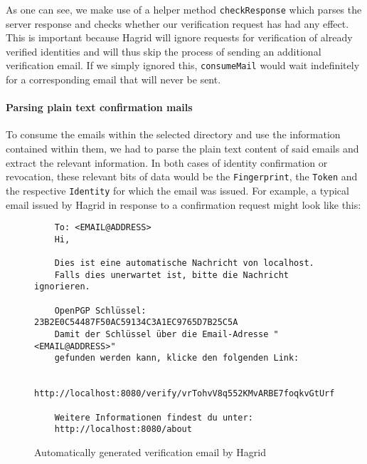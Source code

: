 As one can see, we make use of a helper method \texttt{checkResponse} which parses the server response and checks whether our verification request has had any effect. This is important because Hagrid will ignore requests for verification of already verified identities and will thus skip the process of sending an additional verification email. If we simply ignored this, \texttt{consumeMail} would wait indefinitely for a corresponding email that will never be sent. 

\paragraph{Parsing plain text confirmation mails}
To consume the emails within the selected directory and use the information contained within them, we had to parse the plain text content of said emails and extract the relevant information. In both cases of identity confirmation or revocation, these relevant bits of data would be the \texttt{Fingerprint}, the \texttt{Token} and the respective \texttt{Identity} for which the email was issued. For example, a typical email issued by Hagrid in response to a confirmation request might look like this: 
\begin{figure}[H]
    \begin{verbatim}
    To: <EMAIL@ADDRESS> 
    Hi,
    
    Dies ist eine automatische Nachricht von localhost.
    Falls dies unerwartet ist, bitte die Nachricht ignorieren.

    OpenPGP Schlüssel: 23B2E0C54487F50AC59134C3A1EC9765D7B25C5A 
    Damit der Schlüssel über die Email-Adresse "<EMAIL@ADDRESS>" 
    gefunden werden kann, klicke den folgenden Link:
    
    http://localhost:8080/verify/vrTohvV8q552KMvARBE7foqkvGtUrf
    
    Weitere Informationen findest du unter:
    http://localhost:8080/about
    \end{verbatim}
    \caption{Automatically generated verification email by Hagrid}
\end{figure}

